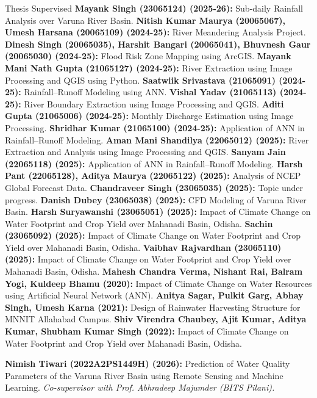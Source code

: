\begin{rubric}{Thesis Supervised}
\entry*{} \textbf{Mayank Singh (23065124) (2025-26):} Sub-daily Rainfall Analysis over Varuna River Basin.
\entry*{} \textbf{Nitish Kumar Maurya (20065067), Umesh Harsana (20065109) (2024-25):} River Meandering Analysis Project.
\entry*{} \textbf{Dinesh Singh (20065035), Harshit Bangari (20065041), Bhuvnesh Gaur (20065030) (2024-25):} Flood Risk Zone Mapping using ArcGIS.
\entry*{} \textbf{Mayank Mani Nath Gupta (21065127) (2024-25):} River Extraction using Image Processing and QGIS using Python.
\entry*{} \textbf{Saatwiik Srivastava (21065091) (2024-25):} Rainfall--Runoff Modeling using ANN.
\entry*{} \textbf{Vishal Yadav (21065113) (2024-25):} River Boundary Extraction using Image Processing and QGIS.
\entry*{} \textbf{Aditi Gupta (21065006) (2024-25):} Monthly Discharge Estimation using Image Processing.
\entry*{} \textbf{Shridhar Kumar (21065100) (2024-25):} Application of ANN in Rainfall--Runoff Modeling.
\entry*{} \textbf{Aman Mani Shandilya (22065012) (2025):} River Extraction and Analysis using Image Processing and QGIS.
\entry*{} \textbf{Sanyam Jain (22065118) (2025):} Application of ANN in Rainfall--Runoff Modeling.
\entry*{} \textbf{Harsh Pant (22065128), Aditya Maurya (22065122) (2025):} Analysis of NCEP Global Forecast Data.
\entry*{} \textbf{Chandraveer Singh (23065035) (2025):} Topic under progress.
\entry*{} \textbf{Danish Dubey (23065038) (2025):} CFD Modeling of Varuna River Basin.
\entry*{} \textbf{Harsh Suryawanshi (23065051) (2025):} Impact of Climate Change on Water Footprint and Crop Yield over Mahanadi Basin, Odisha.
\entry*{} \textbf{Sachin (23065092) (2025):} Impact of Climate Change on Water Footprint and Crop Yield over Mahanadi Basin, Odisha.
\entry*{} \textbf{Vaibhav Rajvardhan (23065110) (2025):} Impact of Climate Change on Water Footprint and Crop Yield over Mahanadi Basin, Odisha.
\entry*{} \textbf{Mahesh Chandra Verma, Nishant Rai, Balram Yogi, Kuldeep Bhamu (2020):} Impact of Climate Change on Water Resources using Artificial Neural Network (ANN).
\entry*{} \textbf{Anitya Sagar, Pulkit Garg, Abhay Singh, Umesh Karna (2021):} Design of Rainwater Harvesting Structure for MNNIT Allahabad Campus.
\entry*{} \textbf{Shiv Virendra Chaubey, Ajit Kumar, Aditya Kumar, Shubham Kumar Singh (2022):} Impact of Climate Change on Water Footprint and Crop Yield over Mahanadi Basin, Odisha.


\entry*{} \textbf{Nimish Tiwari (2022A2PS1449H) (2026):} Prediction of Water Quality Parameters of the Varuna River Basin using Remote Sensing and Machine Learning. \emph{Co-supervisor with Prof. Abhradeep Majumder (BITS Pilani).}
\end{rubric}